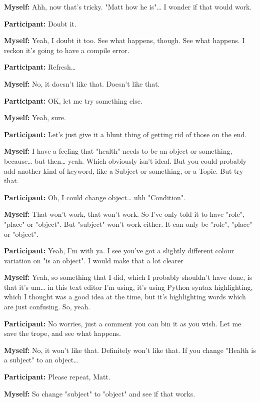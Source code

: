 \documentclass[11pt]{report}
\begin{document}
\begin{linenumbers}
\textbf{Myself:} Ahh, now that's tricky. "Matt how he is"\ldots{} I wonder if that would work.

\textbf{Participant:} Doubt it.

\textbf{Myself:} Yeah, I doubt it too. See what happens, though. See what happens. I reckon it's going to have a compile error.

\textbf{Participant:} Refresh\ldots{}

\textbf{Myself:} No, it doesn't like that. Doesn't like that.

\textbf{Participant:} OK, let me try something else.

\textbf{Myself:} Yeah, sure.

\textbf{Participant:} Let's just give it a blunt thing of getting rid of those on the end.

\textbf{Myself:} I have a feeling that "health" needs to be an object or something, because\ldots{} but then\ldots{} yeah. Which obviously isn't ideal. But you could probably add another kind of keyword, like a Subject or something, or a Topic. But try that.

\textbf{Participant:} Oh, I could change object\ldots{} uhh "Condition".

\textbf{Myself:} That won't work, that won't work. So I've only told it to have
"role", "place" or "object". But "subject" won't work either. It can only be
"role", "place" or "object".

\textbf{Participant:} Yeah, I'm with ya. I see you've got a slightly different colour variation on "is an object". I would make that a lot clearer

\textbf{Myself:} Yeah, so something that I did, which I probably shouldn't have done, is that it's um\ldots{} in this text editor I'm using, it's using Python syntax highlighting, which I thought was a good idea at the time, but it's highlighting words which are just confusing. So, yeah.

\textbf{Participant:} No worries, just a comment you can bin it as you wish. Let me save the trope, and see what happens.

\textbf{Myself:} No, it won't like that. Definitely won't like that. If you change "Health is a subject" to an object\ldots{}

\textbf{Participant:} Please repeat, Matt.

\textbf{Myself:} So change "subject" to "object" and see if that works.


\end{linenumbers}
\end{document}
